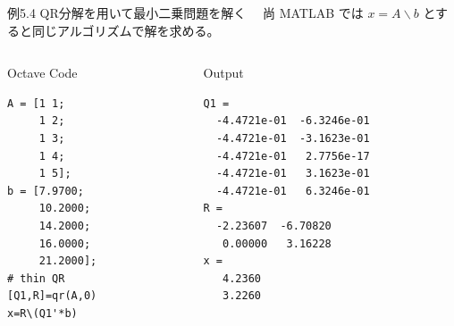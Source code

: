 \documentclass[dvipdfmx,10pt,presentation]{beamer}
\begin{document}
\begin{frame}[fragile,label={sec:org2785add}]{例5.4 QR分解を用いて最小二乗問題を解く}
 　尚 MATLAB では \(x=A\backslash b\) とすると同じアルゴリズムで解を求める。\\
\begin{columns}
\begin{column}{0.23\columnwidth}
\begin{block}{Octave Code}
\begin{verbatim}
A = [1 1;
     1 2; 
     1 3;
     1 4;
     1 5];
b = [7.9700;
     10.2000;
     14.2000;
     16.0000;
     21.2000];
# thin QR
[Q1,R]=qr(A,0)
x=R\(Q1'*b)
\end{verbatim}
\end{block}
\end{column}

\begin{column}{0.73\columnwidth}
\begin{block}{Output}
\begin{verbatim}
Q1 =
  -4.4721e-01  -6.3246e-01
  -4.4721e-01  -3.1623e-01
  -4.4721e-01   2.7756e-17
  -4.4721e-01   3.1623e-01
  -4.4721e-01   6.3246e-01
R =
  -2.23607  -6.70820
   0.00000   3.16228
x =
   4.2360
   3.2260
\end{verbatim}
\end{block}
\end{column}
\end{columns}
\end{frame}
\end{document}
